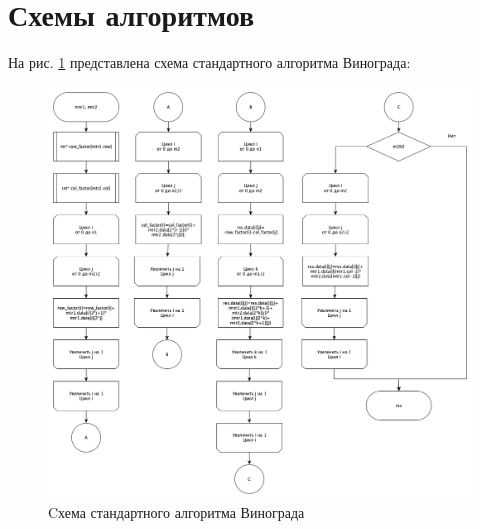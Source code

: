 \documentclass[12pt]{report}
\begin{document}
\section{Схемы алгоритмов}

На рис. \ref{fig:def} представлена  схема стандартного алгоритма Винограда:
	\begin{figure}[h]
        	\begin{center}
        		\includegraphics[scale=0.32]{standart_vinograd2}
        		\caption{Cхема стандартного алгоритма Винограда}
        		\label{fig:def}
        	\end{center}
        \end{figure}
        
\end{document}
